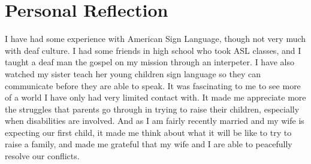 \documentclass[onecolumn, 12pt]{article}
\begin{document}
\section*{Personal Reflection}

I have had some experience with American Sign Language, though not very much
with deaf culture.  I had some friends in high school who took ASL classes, and
I taught a deaf man the gospel on my mission through an interpeter.  I have
also watched my sister teach her young children sign language so they can
communicate before they are able to speak.  It was fascinating to me to see
more of a world I have only had very limited contact with.  It made me
appreciate more the struggles that parents go through in trying to raise their
children, especially when disabilities are involved.  And as I am fairly
recently married and my wife is expecting our first child, it made me think
about what it will be like to try to raise a family, and made me grateful that
my wife and I are able to peacefully resolve our conflicts.
\end{document}
